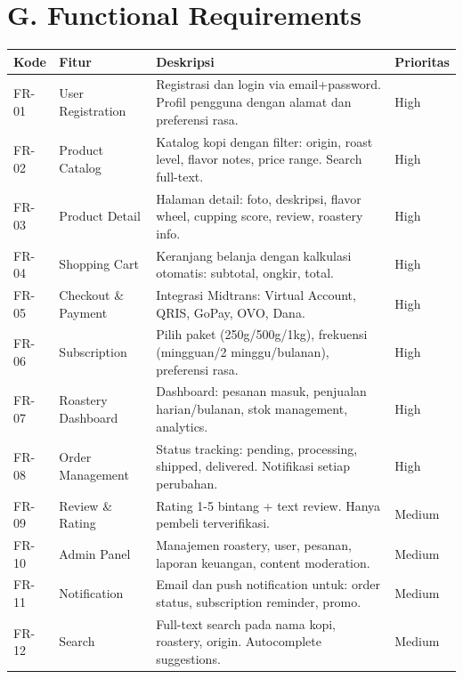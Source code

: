 \documentclass[11pt,a4paper]{article}
\begin{document}
\section{G. Functional Requirements}
\noindent\small
\begin{tabularx}{\textwidth}{|X|X|X|X|}
\hline
\centering\textbf{Kode}\arraybackslash & \centering\textbf{Fitur}\arraybackslash & \centering\textbf{Deskripsi}\arraybackslash & \centering\textbf{Prioritas}\arraybackslash \\\hline
FR-01 & User Registration & Registrasi dan login via email+password. Profil pengguna dengan alamat dan preferensi rasa. & High \\\hline
FR-02 & Product Catalog & Katalog kopi dengan filter: origin, roast level, flavor notes, price range. Search full-text. & High \\\hline
FR-03 & Product Detail & Halaman detail: foto, deskripsi, flavor wheel, cupping score, review, roastery info. & High \\\hline
FR-04 & Shopping Cart & Keranjang belanja dengan kalkulasi otomatis: subtotal, ongkir, total. & High \\\hline
FR-05 & Checkout \& Payment & Integrasi Midtrans: Virtual Account, QRIS, GoPay, OVO, Dana. & High \\\hline
FR-06 & Subscription & Pilih paket (250g/500g/1kg), frekuensi (mingguan/2 minggu/bulanan), preferensi rasa. & High \\\hline
FR-07 & Roastery Dashboard & Dashboard: pesanan masuk, penjualan harian/bulanan, stok management, analytics. & High \\\hline
FR-08 & Order Management & Status tracking: pending, processing, shipped, delivered. Notifikasi setiap perubahan. & High \\\hline
FR-09 & Review \& Rating & Rating 1-5 bintang + text review. Hanya pembeli terverifikasi. & Medium \\\hline
FR-10 & Admin Panel & Manajemen roastery, user, pesanan, laporan keuangan, content moderation. & Medium \\\hline
FR-11 & Notification & Email dan push notification untuk: order status, subscription reminder, promo. & Medium \\\hline
FR-12 & Search & Full-text search pada nama kopi, roastery, origin. Autocomplete suggestions. & Medium \\\hline
\end{tabularx}\normalsize
\end{document}
